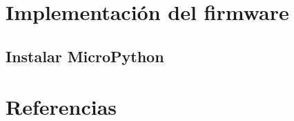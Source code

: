 


	

	\null\newpage %

	\tableofcontents
	
	\chapter{Implementación del firmware}
		\section{Instalar MicroPython}
	 	    
	 	    
  \chapter{Referencias}      
    \printbibliography[heading=none]

